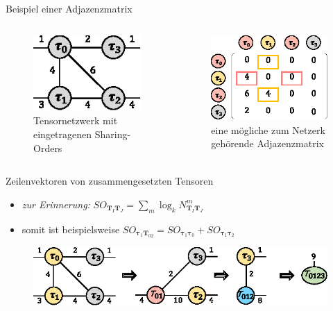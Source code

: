 \documentclass{beamer}
\begin{document}
			\begin{frame}{Beispiel einer Adjazenzmatrix}
				\begin{columns}
					\begin{figure}
						\includegraphics[scale=1.7]{figure_03_a_mid}
						\caption*{Tensornetzwerk mit eingetragenen Sharing-Orders}
					\end{figure}
					\begin{figure}
						\includegraphics[scale=1.3]{figure_05_c}
						\caption*{eine mögliche zum Netzerk gehörende Adjazenzmatrix}
					\end{figure}
				\end{columns}
			\end{frame}

			\begin{frame}{Zeilenvektoren von zusammengesetzten Tensoren}
				\begin{itemize}
					\item \textit{zur Erinnerung:} $SO_{\bm{T}_I \bm{T}_J} = \sum_m \log_k N^m_{\bm{T}_I \bm{T}_J}$
					\item somit ist beispielsweise $SO_{\bm{\tau}_1 \bm{T}_{02}} = SO_{\bm{\tau}_1 \bm{\tau}_0} + SO_{\bm{\tau}_1 \bm{\tau}_2}$
				\end{itemize} \pause

				\begin{figure}
					\includegraphics{figure_03_b_low}
				\end{figure}
			\end{frame}
\end{document}
